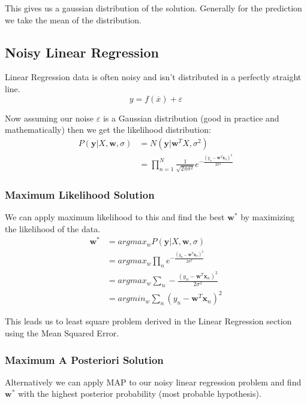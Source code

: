 \documentclass[12pt]{article}
\begin{document}
            This gives us a gaussian distribution of the solution. Generally for the prediction we take the mean of the distribution. 
    
    \subsection{Noisy Linear Regression}
        Linear Regression data is often noisy and isn't distributed in a perfectly straight line. 
        $$ y = f(\overline{x}) + \varepsilon $$

        Now assuming our noise $\varepsilon$ is a Gaussian distribution (good in practice and mathematically) then we get the likelihood distribution:
        \begin{align*}
            P(\boldsymbol{y}|X,\boldsymbol{w}, \sigma) &= N(\boldsymbol{y}|\boldsymbol{w}^TX, \sigma^2) \\
            &= \prod_{n=1}^N \frac{1}{\sqrt{2\pi\sigma^2}}e^{-\frac{(y_n - \boldsymbol{w}^T\boldsymbol{x}_n)^2}{2\sigma^2}}
        \end{align*}
        
        \subsubsection{Maximum Likelihood Solution}
            We can apply maximum likelihood to this and find the best $\boldsymbol{w}^*$ by maximizing the likelihood of the data.
            \begin{align*}
                \boldsymbol{w^*} &= argmax_w P(\boldsymbol{y}|X, \boldsymbol{w}, \sigma) \\
                &= argmax_w \prod_{n} e^{-\frac{(y_n - \boldsymbol{w}^T\boldsymbol{x}_n)^2}{2\sigma^2}} \\
                &= argmax_w \sum_{n} -\frac{(y_n - \boldsymbol{w}^T\boldsymbol{x}_n)^2}{2\sigma^2} \\
                &= argmin_w \sum_{n} (y_n - \boldsymbol{w}^T\boldsymbol{x}_n)^2
            \end{align*}

            This leads us to least square problem derived in the Linear Regression section using the Mean Squared Error.

        \subsubsection{Maximum A Posteriori Solution}
            Alternatively we can apply MAP to our noisy linear regression problem and find $\boldsymbol{w}^*$ with the highest posterior probability (most probable hypothesis).
            
\end{document}
